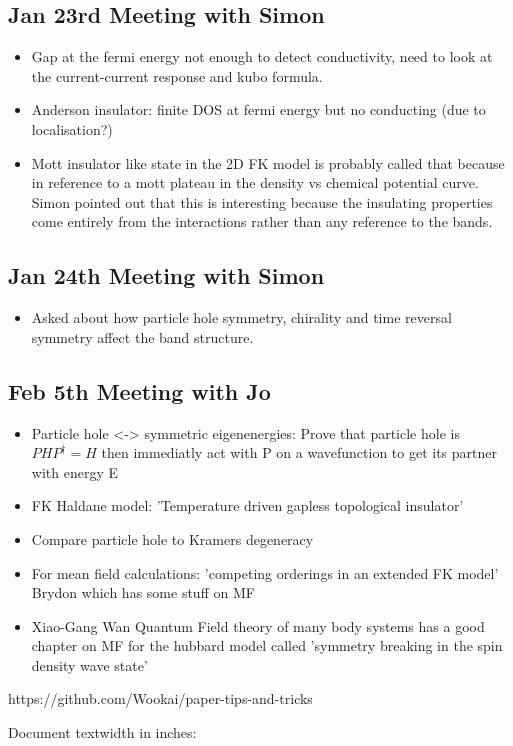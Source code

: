 \documentclass[a4paper, 11pt, onecolumn]{article}
\begin{document}
\subsection{Jan 23rd Meeting with Simon}
\begin{itemize}
    \item Gap at the fermi energy not enough to detect conductivity, need to look at the current-current response and kubo formula.
    \item Anderson insulator: finite DOS at fermi energy but no conducting (due to localisation?)
    \item Mott insulator like state in the 2D FK model is probably called that because in reference to a mott plateau in the density vs chemical potential curve. Simon pointed out that this is interesting because the insulating properties come entirely from the interactions rather than any reference to the bands.
\end{itemize}

\subsection{Jan 24th Meeting with Simon}
\begin{itemize}
    \item Asked about how particle hole symmetry, chirality and time reversal symmetry affect the band structure. 
\end{itemize}

\subsection{Feb 5th Meeting with Jo}
\begin{itemize}
    \item Particle hole <-> symmetric eigenenergies: Prove that particle hole is $PHP^\dagger = H$ then immediatly act with P on a wavefunction to get its partner with energy E
    \item FK Haldane model: 'Temperature driven gapless topological insulator'
    \item Compare particle hole to Kramers degeneracy
    \item For mean field calculations: 'competing orderings in an extended FK model' Brydon which has some stuff on MF
    \item Xiao-Gang Wan Quantum Field theory of many body systems has a good chapter on MF for the hubbard model called 'symmetry breaking in the spin density wave state'
 \end{itemize}
 
 https://github.com/Wookai/paper-tips-and-tricks


Document textwidth in inches: \prntlen{\textwidth}



\end{document}
